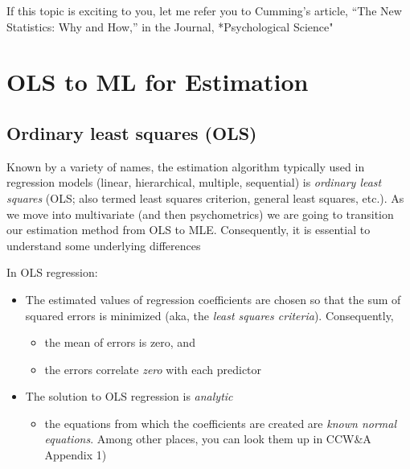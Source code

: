 \documentclass[
  english,
]{book}
\providecommand{\tightlist}{%
  \setlength{\itemsep}{0pt}\setlength{\parskip}{0pt}}
\begin{document}
If this topic is exciting to you, let me refer you to Cumming's \citep{cumming_new_2014} article, ``The New Statistics: Why and How,'' in the Journal, *Psychological Science"

\hypertarget{ols-to-ml-for-estimation}{%
\section{OLS to ML for Estimation}\label{ols-to-ml-for-estimation}}

\hypertarget{ordinary-least-squares-ols}{%
\subsection{Ordinary least squares (OLS)}\label{ordinary-least-squares-ols}}

Known by a variety of names, the estimation algorithm typically used in regression models (linear, hierarchical, multiple, sequential) is \emph{ordinary least squares} (OLS; also termed least squares criterion, general least squares, etc.). As we move into multivariate (and then psychometrics) we are going to transition our estimation method from OLS to MLE. Consequently, it is essential to understand some underlying differences \citep{cohen_applied_2003, myung_tutorial_2003}

In OLS regression:

\begin{itemize}
\tightlist
\item
  The estimated values of regression coefficients are chosen so that the sum of squared errors is minimized (aka, the \emph{least squares criteria}). Consequently,

  \begin{itemize}
  \tightlist
  \item
    the mean of errors is zero, and
  \item
    the errors correlate \emph{zero} with each predictor
  \end{itemize}
\item
  The solution to OLS regression is \emph{analytic}

  \begin{itemize}
  \tightlist
  \item
    the equations from which the coefficients are created are \emph{known normal equations}. Among other places, you can look them up in CCW\&A \citep{cohen_introduction_1934} Appendix 1)
  \end{itemize}
\end{itemize}
\end{document}
